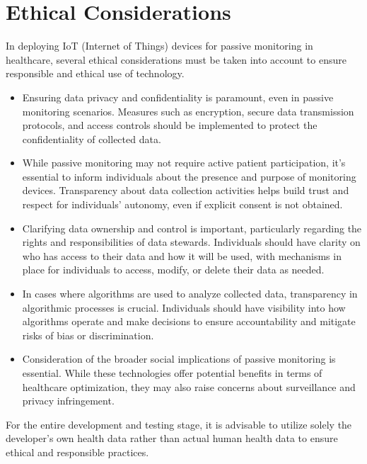 \chapter{Ethical Considerations}
\label{app:ethical}

In deploying IoT (Internet of Things) devices for passive monitoring in healthcare, several ethical considerations must be taken into account to ensure responsible and ethical use of technology.
\begin{itemize}
    \item Ensuring data privacy and confidentiality is paramount, even in passive monitoring scenarios. Measures such as encryption, secure data transmission protocols, and access controls should be implemented to protect the confidentiality of collected data.
    \item While passive monitoring may not require active patient participation, it's essential to inform individuals about the presence and purpose of monitoring devices. Transparency about data collection activities helps build trust and respect for individuals' autonomy, even if explicit consent is not obtained.
    \item Clarifying data ownership and control is important, particularly regarding the rights and responsibilities of data stewards. Individuals should have clarity on who has access to their data and how it will be used, with mechanisms in place for individuals to access, modify, or delete their data as needed.
    \item In cases where algorithms are used to analyze collected data, transparency in algorithmic processes is crucial. Individuals should have visibility into how algorithms operate and make decisions to ensure accountability and mitigate risks of bias or discrimination.
    \item Consideration of the broader social implications of passive monitoring is essential. While these technologies offer potential benefits in terms of healthcare optimization, they may also raise concerns about surveillance and privacy infringement. 
\end{itemize}

\noindent For the entire development and testing stage, it is advisable to utilize solely the developer's own health data rather than actual human health data to ensure ethical and responsible practices.
